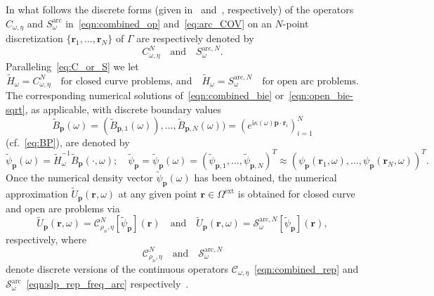 \documentclass[11pt]{article}
\theoremstyle{plain}
\theoremstyle{remark}
\def \br{\mathbf{r}}
\def \bp{\mathbf{p}}
\begin{document}
In what follows the discrete forms (given
in~\cite[Sec. 3.6]{COLTON:2019} and~\cite{lintner2015generalized},
respectively) of the operators $C_{\omega,\eta}$ and
$S^\mathrm{arc}_\omega$ in~\eqref{eqn:combined_op}
and~\eqref{eq:arc_COV} on an $N$-point discretization
$\{\br_1,\dots,\br_N \}$ of $\Gamma$ are respectively denoted by
\begin{equation}
  \label{eq:discr_opers}
  C_{\omega,\eta}^N \quad\mbox{and}\quad S_\omega^{\mathrm{arc},N}.
\end{equation}
Paralleling~\eqref{eq:C_or_S} we let
\begin{equation}
  \label{eq:C_or_S-num}
  \widetilde{H}_\omega = C_{\omega,\eta}^N\quad\mbox{for closed curve problems, and}\quad \widetilde{H}_\omega = S_\omega^{\mathrm{arc},N}\quad \mbox{for open arc problems.}
\end{equation}
The corresponding numerical solutions of~\eqref{eqn:combined_bie}
or~\eqref{eqn:open_bie-sqrt}, as applicable, with discrete boundary
values
\begin{equation}
  \label{eq:BP-disc}
   \widetilde{B}_\bp(\omega) = (\widetilde{B}_{\bp,1}(\omega)),\dots,\widetilde{B}_{\bp,N}(\omega))  = (e^{\mathrm{i}\kappa(\omega)\bp \cdot \br_i})_{i=1}^N
\end{equation}
(cf.~\eqref{eq:BP}), are denoted by
\begin{equation}\label{disc_vrsn}
  \widetilde\psi_{\bp}(\omega)  = \widetilde{H}_{\omega}^{-1} \widetilde{B}_\bp(\cdot ,\omega);\quad  \widetilde\psi_{\bp}=\widetilde\psi_{\bp}(\omega) = (\widetilde\psi_{\bp,1},\dots,\widetilde\psi_{\bp,N})^T\approx (\psi_\bp(\br_1,\omega),\dots,\psi_{\bp}(\br_N,\omega))^T.
\end{equation}
Once the numerical density vector $\widetilde\psi_{\bp}(\omega)$ has
been obtained, the numerical approximation
$\widetilde{U}_\bp(\mathbf{r},\omega)$ at any given point
$\mathbf{r}\in\Omega^\mathrm{ext}$ is obtained for closed curve and
open are problems via
\begin{equation}\label{eqn:Unum}
 \widetilde{U}_\bp(\br, \omega) = \mathcal{C}_{\rho_n,\eta}^N[\widetilde\psi_{\bp}](\br)\quad \text{and} \quad \widetilde{U}_\bp(\br, \omega) =  \mathcal{S}^{\mathrm{arc},N}_{\omega}[ \widetilde\psi_{\bp}](\br),
\end{equation}
respectively, where
\begin{equation}\label{eqn:disc_prop_ops}
    \mathcal{C}_{\rho_n,\eta}^N \quad \text{and} \quad  \mathcal{S}^{\mathrm{arc},N}_{\omega}
\end{equation}
denote discrete versions of the continuous operators
$\mathcal{C}_{\omega,\eta}$~\eqref{eqn:combined_rep} and
$\mathcal{S}^\mathrm{arc}_\omega$~\eqref{eqn:slp_rep_freq_arc}
respectively~\cite{COLTON:2019,lintner2015generalized}.
\end{document}
